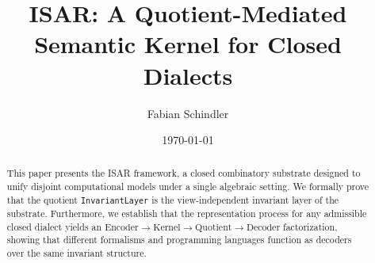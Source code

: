\documentclass{report}
\title{ISAR: A Quotient-Mediated Semantic Kernel for Closed Dialects}
\author{Fabian Schindler}
\date{\today}
\begin{document}
\maketitle

\begin{abstract}
This paper presents the ISAR framework, a closed combinatory substrate designed to unify disjoint computational models under a single algebraic setting. We formally prove that the quotient \texttt{InvariantLayer} is the view-independent invariant layer of the substrate. Furthermore, we establish that the representation process for any admissible closed dialect yields an $\text{Encoder} \to \text{Kernel} \to \text{Quotient} \to \text{Decoder}$ factorization, showing that different formalisms and programming languages function as decoders over the same invariant structure.
\end{abstract}


\end{document}
